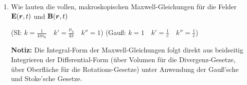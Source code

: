 \begin{enumerate}

  \item Wie lauten die vollen, makroskopischen Maxwell-Gleichungen für
        die Felder $\vb E(\vb* r, t)$ und $\vb B(\vb* r, t)$
        \begin{center}
        (SI: $k=\frac{1}{4\pi\epsilon_0}\quad k'=\frac{\mu_0}{4\pi}\quad
                  k''=1$)
        (Gauß: $k=1\quad k'=\frac{1}{c}\quad
             k''=\frac{1}{c}$) 
        \end{center}
        \begin{center}
        \end{center}
        
        \textbf{Notiz:} Die Integral-Form der Maxwell-Gleichungen folgt
        direkt aus beidseitig Integrieren der Differential-Form (über 
        Volumen für die Divergenz-Gesetze, über Oberfläche für die 
        Rotations-Gesetze) unter Anwendung der Gauß'sche und 
        Stoke'sche Gesetze.


\end{enumerate}

